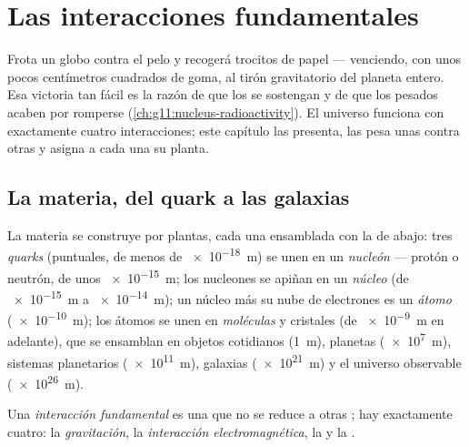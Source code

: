 \chapter{Las interacciones fundamentales}\label{ch:g11:fundamental-interactions}

Frota un globo contra el pelo y recogerá trocitos de papel ---
venciendo, con unos pocos centímetros cuadrados de goma, al tirón
gravitatorio del planeta entero. Esa victoria tan fácil es la razón de
que los  se sostengan y de que los  pesados acaben por
romperse (\cref{ch:g11:nucleus-radioactivity}). El universo funciona con
exactamente cuatro interacciones; este capítulo las presenta, las pesa
unas contra otras y asigna a cada una su planta.

\section{La materia, del quark a las galaxias}

\begin{definition}\label{def:g11:fundamental-interactions:ladder}
La materia se construye por plantas, cada una ensamblada con la de
abajo: tres \emph{quarks} (puntuales, de menos de
\qty{e-18}{m}) se unen en un \emph{nucleón} --- protón o
neutrón, de unos \qty{e-15}{m}; los nucleones se apiñan en un
\emph{núcleo} (de \qty{e-15}{m} a \qty{e-14}{m}); un
núcleo más su nube de electrones es un \emph{átomo}
(\qty{e-10}{m}); los átomos se unen en \emph{moléculas}
y cristales (de \qty{e-9}{m} en adelante), que se ensamblan en objetos
cotidianos (\qty{1}{m}), planetas (\qty{e7}{m}), sistemas planetarios
(\qty{e11}{m}), galaxias (\qty{e21}{m}) y el universo observable
(\qty{e26}{m}).
\end{definition}

\begin{definition}\label{def:g11:fundamental-interactions:four}
Una \emph{interacción fundamental} es una
 que no se reduce a otras ; hay exactamente cuatro: la
\emph{gravitación}, la \emph{interacción
electromagnética}, la  y la .
\end{definition}

